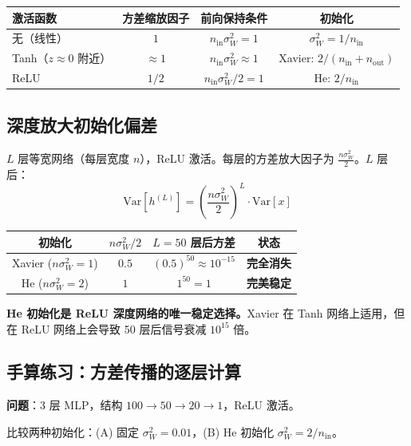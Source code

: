 \documentclass[12pt, a4paper]{ctexart}
\begin{document}
\begin{center}
\begin{tabular}{l|ccc}
激活函数 & 方差缩放因子 & 前向保持条件 & 初始化 \\
\hline
无（线性）& $1$ & $n_{\text{in}} \sigma_W^2 = 1$ & $\sigma_W^2 = 1/n_{\text{in}}$ \\
Tanh（$z \approx 0$ 附近）& $\approx 1$ & $n_{\text{in}} \sigma_W^2 \approx 1$ & Xavier: $2/(n_{\text{in}}+n_{\text{out}})$ \\
ReLU & $1/2$ & $n_{\text{in}} \sigma_W^2 / 2 = 1$ & He: $2/n_{\text{in}}$ \\
\end{tabular}
\end{center}

\subsection{深度放大初始化偏差}

$L$ 层等宽网络（每层宽度 $n$），ReLU 激活。每层的方差放大因子为 $\frac{n\sigma_W^2}{2}$。$L$ 层后：
\begin{equation}
    \text{Var}[h^{(L)}] = \left(\frac{n \sigma_W^2}{2}\right)^L \cdot \text{Var}[x]
\end{equation}

\begin{center}
\begin{tabular}{c|ccc}
初始化 & $n\sigma_W^2/2$ & $L = 50$ 层后方差 & 状态 \\
\hline
Xavier ($n\sigma_W^2 = 1$) & $0.5$ & $(0.5)^{50} \approx 10^{-15}$ & \textbf{完全消失} \\
He ($n\sigma_W^2 = 2$) & $1$ & $1^{50} = 1$ & \textbf{完美稳定} \\
\end{tabular}
\end{center}

\textbf{He 初始化是 ReLU 深度网络的唯一稳定选择。}Xavier 在 Tanh 网络上适用，但在 ReLU 网络上会导致 50 层后信号衰减 $10^{15}$ 倍。

\subsection{手算练习：方差传播的逐层计算}

\textbf{问题}：3 层 MLP，结构 $100 \to 50 \to 20 \to 1$，ReLU 激活。

比较两种初始化：(A) 固定 $\sigma_W^2 = 0.01$，(B) He 初始化 $\sigma_W^2 = 2/n_{\text{in}}$。
\end{document}
